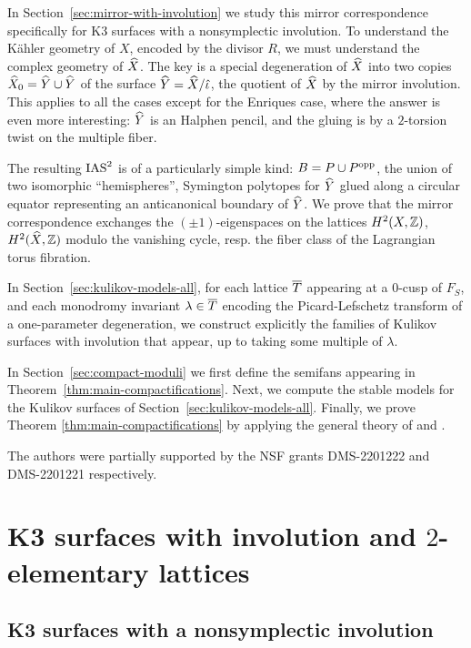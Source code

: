\documentclass{amsart}
\begin{document}
In Section~\ref{sec:mirror-with-involution} we study this mirror
correspondence specifically for K3 surfaces with a nonsymplectic
involution. To understand the K\"ahler geometry of $X$, encoded by
the divisor $R$, we must understand the complex geometry of ${\widehat X}$.
The key is a special degeneration of ${\widehat X}$ into two copies ${\widehat X}_0 = {\widehat Y}\cup {\widehat Y}$
of the surface ${\widehat Y}={\widehat X}/\hat \iota$, the quotient of ${\widehat X}$ by the mirror
involution. This applies to all the cases except for the Enriques
case, where the answer is even more interesting: ${\widehat Y}$ is an Halphen
pencil, and the gluing is by a $2$-torsion
twist on the multiple fiber.

The resulting $\operatorname{IAS}^2$ is of a particularly simple kind:
$B=P\cup P^{\rm opp}$, the union of two isomorphic ``hemispheres'', 
Symington polytopes for ${\widehat Y}$ glued along a circular equator representing
an anticanonical boundary of ${\widehat Y}$.
 We prove that the mirror correspondence exchanges the
$(\pm1)$-eigenspaces on the lattices $H^2(X,{\mathbb Z})$, $H^2({\widehat X},{\mathbb Z})$
modulo the vanishing cycle, resp. the fiber class of the Lagrangian
torus fibration.

In Section~\ref{sec:kulikov-models-all}, for each lattice ${\overline T}$
appearing at a $0$-cusp of $F_S$, and each monodromy invariant
$\lambda\in{\overline T}$ encoding the Picard-Lefschetz transform of a one-parameter
degeneration, we construct explicitly the families of Kulikov surfaces with involution
that appear, up to taking some multiple of $\lambda$.

In Section~\ref{sec:compact-moduli} we first define the semifans appearing in
Theorem~\ref{thm:main-compactifications}. Next, we compute the
stable models for the Kulikov surfaces of
Section~\ref{sec:kulikov-models-all}. Finally, we prove 
Theorem \ref{thm:main-compactifications}
by applying the general theory of \cite{alexeev2021compact}
and \cite{alexeev2021nonsymplectic}.

\begin{acknowledgements}
  The authors were partially supported by the NSF grants DMS-2201222
  and DMS-2201221 respectively.
\end{acknowledgements}

\section{K3 surfaces with involution and $2$-elementary lattices} 
\label{sec:2-el}

\subsection{K3 surfaces with a nonsymplectic involution}
\label{sec:k3-with-invo}
\end{document}
